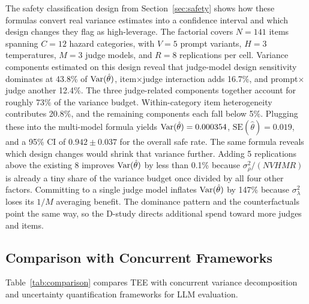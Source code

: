 The safety classification design from Section~\ref{sec:safety} shows how these formulas convert real variance estimates into a confidence interval and which design changes they flag as high-leverage. The factorial covers $N = 141$ items spanning $C = 12$ hazard categories, with $V = 5$ prompt variants, $H = 3$ temperatures, $M = 3$ judge models, and $R = 8$ replications per cell. Variance components estimated on this design reveal that judge-model design sensitivity dominates at 43.8\% of $\operatorname{Var}(\hat\theta)$, item$\times$judge interaction adds 16.7\%, and prompt$\times$judge another 12.4\%. The three judge-related components together account for roughly 73\% of the variance budget. Within-category item heterogeneity contributes 20.8\%, and the remaining components each fall below 5\%. Plugging these into the multi-model formula yields $\operatorname{Var}(\hat\theta) = 0.000354$, $\text{SE}(\hat\theta) = 0.019$, and a 95\% CI of $0.942 \pm 0.037$ for the overall safe rate. The same formula reveals which design changes would shrink that variance further. Adding 5 replications above the existing 8 improves $\operatorname{Var}(\hat\theta)$ by less than 0.1\% because $\sigma^2_\rho/(NVHMR)$ is already a tiny share of the variance budget once divided by all four other factors. Committing to a single judge model inflates $\operatorname{Var}(\hat\theta)$ by 147\% because $\sigma^2_\lambda$ loses its $1/M$ averaging benefit. The dominance pattern and the counterfactuals point the same way, so the D-study directs additional spend toward more judges and items.



\subsection{Comparison with Concurrent Frameworks}
\label{si:comparison}

Table~\ref{tab:comparison} compares TEE with concurrent variance decomposition and uncertainty quantification frameworks for LLM evaluation.

